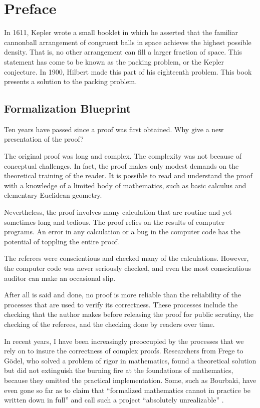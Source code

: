 \chapter{Preface}

In 1611, Kepler wrote a small booklet in which he asserted that the familiar cannonball arrangement of congruent balls in space achieves the highest possible density.  That is, no other arrangement can fill a larger fraction of space.  This statement has come to be known as the packing problem, or the Kepler conjecture.  In 1900, Hilbert made this part of his eighteenth problem.  This book presents a solution to the packing problem.

\section{Formalization Blueprint}

Ten years have passed since a proof was first
obtained. Why give a new presentation of the proof?

The original proof was long and complex.  The complexity was not
because of conceptual challenges.  In fact, the proof makes only
modest demands on the theoretical training of the reader.  It is
possible to read and understand the proof with a knowledge of a
limited body of mathematics, such as basic calculus and elementary
Euclidean geometry.

Nevertheless, the proof involves many  calculation that are routine
and yet sometimes long and tedious.  The proof relies on the results
of computer programs.  An error in any calculation or a bug in the
computer code has the potential of toppling the entire proof.

The referees were conscientious and checked many of the
calculations.  However, the computer code was never seriously
checked, and even the most conscientious auditor can make an
occasional slip.

After all is said and done, no proof is more reliable than the
reliability of the processes that are used to verify its
correctness.  These processes include the checking that the author
makes before releasing the proof for public scrutiny, the checking
of the referees, and the checking done by readers over time.

In recent years, I have been increasingly preoccupied by the
processes that we rely on to insure the correctness of complex
proofs. Researchers from Frege to G\"odel, who solved a problem of
rigor in mathematics, found a theoretical solution but did not
extinguish the burning fire at the foundations of mathematics,
because they omitted the practical implementation. Some, such as
Bourbaki, have even gone so far as to claim that ``formalized
mathematics cannot in practice be written down in full'' and call
such a project
``absolutely unrealizable'' \cite[p 10,11]{Bo}. %

